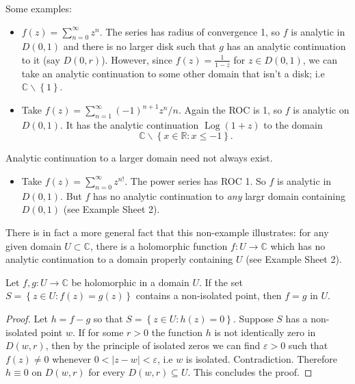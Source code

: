 \documentclass[egregdoesnotlikesansseriftitles,a4paper]{scrartcl}
\begin{document}
\begin{example*}
      Some examples:
      \begin{itemize}
           \item $f (z)=\sum_{n=0}^{\infty}z^{n}$. The series has radius of convergence 1, so $f$ is analytic in $D (0,1)$ and there is no larger disk such that $g$ has an analytic continuation to it (say $D (0,r)$). However, since $f (z)=\frac{1}{1-z}$ for $z \in D (0,1)$, we can take an analytic continuation to some other domain that isn't a disk; i.e $\mathbb{C}\backslash \left\{1\right\}$.
           \item Take $f (z)=\sum_{n=1}^{\infty}(-1)^{n+1}z^n/n$. Again the ROC is 1, so $f$ is analytic on $D (0,1)$. It has the analytic continuation $\operatorname{Log}(1+z)$ to the domain \[
               \mathbb{C}\backslash \left\{x \in \mathbb{R}: x \leq -1\right\}
           .\] 
      \end{itemize}
      Analytic continuation to a larger domain need not always exist.
      \begin{itemize}
           \item Take $f (z)=\sum_{n=0}^{\infty}z^{n!}$. The power series has ROC 1. So $f$ is analytic in $D (0,1)$. But $f$ has no analytic continuation to \emph{any} largr domain containing $D (0,1)$ (see Example Sheet 2).
      \end{itemize}
      \begin{remark}
            There is in fact a more general fact that this non-example illustrates: for any given domain $U \subset \mathbb{C}$, there is a holomorphic function $f: U \rightarrow \mathbb{C}$ which has no analytic continuation to a domain properly containing $U$ (see Example Sheet 2).
      \end{remark}
\end{example*}
\begin{corollary}
      Let $f,g: U \rightarrow \mathbb{C}$ be holomorphic in a domain $U$. If the set $S=\left\{z \in U: f (z)= g (z)\right\}$ contains a non-isolated point, then $f=g$ in $U$.
      \begin{proof}
            Let $h=f-g$ so that $S= \left\{z \in U: h (z)=0\right\}$. Suppose $S$ has a non-isolated point $w$. If for some $r>0$ the function $h$ is not identically zero in $D (w,r)$, then by the principle of isolated zeros we can find $\varepsilon>0$ such that $f (z)\neq 0$ whenever $0< \left|z-w\right|<\varepsilon$, i.e $w$ is isolated. Contradiction. Therefore $h \equiv 0$ on $D (w,r)$ for every $D (w,r) \subseteq U$. This concludes the proof.
      \end{proof}
\end{corollary}
\end{document}
